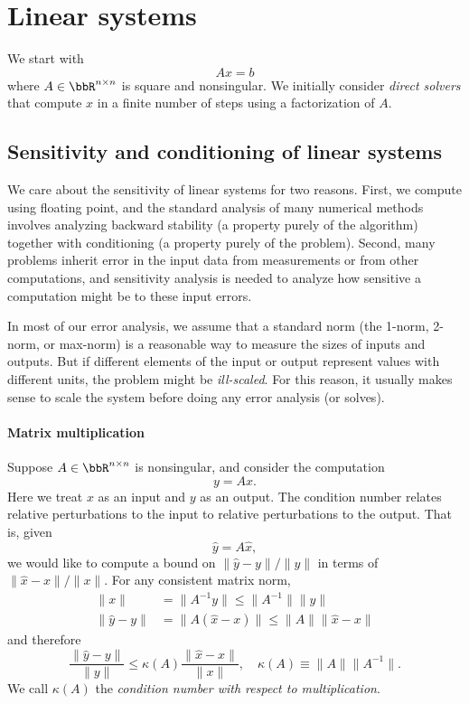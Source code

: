\documentclass[12pt, leqno]{article}
\begin{document}
\newpage
\section{Linear systems}

We start with
\[
  Ax = b
\]
where $A \in \bbR^{n \times n}$ is square and nonsingular.  We
initially consider {\em direct solvers} that compute $x$ in a
finite number of steps using a factorization of $A$.
  
\subsection{Sensitivity and conditioning of linear systems}

We care about the sensitivity of linear systems for two reasons.
First, we compute using floating point, and the standard analysis
of many numerical methods involves analyzing backward stability
(a property purely of the algorithm) together with conditioning
(a property purely of the problem).  Second, many problems inherit
error in the input data from measurements or from other computations,
and sensitivity analysis is needed to analyze how sensitive a
computation might be to these input errors.

In most of our error analysis, we assume that a standard norm
(the 1-norm, 2-norm, or max-norm) is a reasonable way to measure
the sizes of inputs and outputs.  But if different elements of
the input or output represent values with different units, the
problem might be {\em ill-scaled}.  For this reason, it usually
makes sense to scale the system before doing any error analysis
(or solves).

\paragraph{Matrix multiplication}
Suppose $A \in \bbR^{n \times n}$ is nonsingular, and consider the computation
\[
  y = Ax.
\]
Here we treat $x$ as an input and $y$ as an output.  The condition
number relates relative perturbations to the input to relative
perturbations to the output.  That is, given
\[
  \hat{y} = A \hat{x},
\]
we would like to compute a bound on $\|\hat{y}-y\|/\|y\|$ in terms of
$\|\hat{x}-x\|/\|x\|$.  For any consistent matrix norm,
\begin{align*}
  \|x\| &= \|A^{-1} y\| \leq \|A^{-1}\| \|y\| \\
  \|\hat{y}-y\| & = \|A(\hat{x}-x)\| \leq \|A\| \|\hat{x}-x\| 
\end{align*}
and therefore
\[
  \frac{\|\hat{y}-y\|}{\|y\|} \leq \kappa(A)
  \frac{\|\hat{x}-x\|}{\|x\|}, \quad
  \kappa(A) \equiv \|A\| \|A^{-1}\|.
\]
We call $\kappa(A)$ the {\em condition number with respect to multiplication}.
\end{document}
